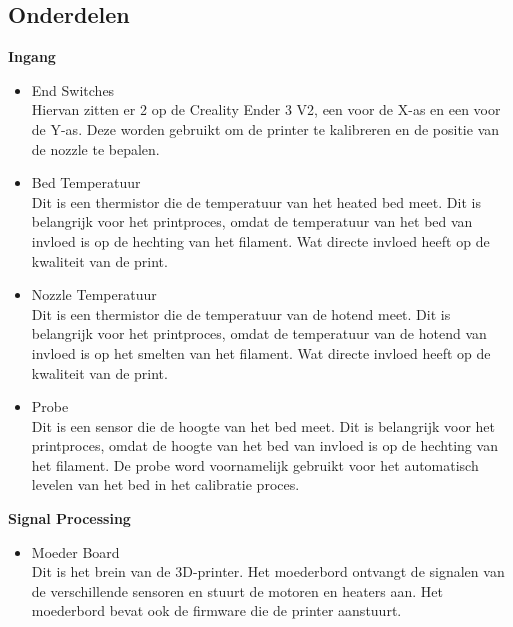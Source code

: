 \documentclass{article}
\begin{document}
\subsection{Onderdelen}
\textbf{Ingang}
\begin{itemize}
  \item End Switches\\
  Hiervan zitten er 2 op de Creality Ender 3 V2, een voor de X-as en een voor de Y-as. Deze worden gebruikt om de printer te kalibreren en de positie van de nozzle te bepalen.
  \item Bed Temperatuur\\
  Dit is een thermistor die de temperatuur van het heated bed meet. Dit is belangrijk voor het printproces, omdat de temperatuur van het bed van invloed is op de hechting van het filament. Wat directe invloed heeft op de kwaliteit van de print.
  \item Nozzle Temperatuur\\
  Dit is een thermistor die de temperatuur van de hotend meet. Dit is belangrijk voor het printproces, omdat de temperatuur van de hotend van invloed is op het smelten van het filament. Wat directe invloed heeft op de kwaliteit van de print.
  \item Probe\\
  Dit is een sensor die de hoogte van het bed meet. Dit is belangrijk voor het printproces, omdat de hoogte van het bed van invloed is op de hechting van het filament. De probe word voornamelijk gebruikt voor het automatisch levelen van het bed in het calibratie proces.
\end{itemize}

\textbf{Signal Processing}
\begin{itemize}
  \item Moeder Board\\
  Dit is het brein van de 3D-printer. Het moederbord ontvangt de signalen van de verschillende sensoren en stuurt de motoren en heaters aan. Het moederbord bevat ook de firmware die de printer aanstuurt.
\end{itemize}
\end{document}
